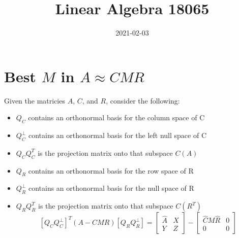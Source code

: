 \documentclass{article}
\title{Linear Algebra 18065}
\date{2021-02-03}
\begin{document}
\maketitle
\section{Best $M$ in $A\approx CMR$}
Given the matricies $A$, $C$, and $R$, consider the following:
\begin{itemize}
  \item $Q_C$ contains an orthonormal basis for the column space of C
  \item $Q_C^\perp$ contains an orthonormal basis for the left null space of C
  \item $Q_C Q_C^T$ is the projection matrix onto that subspace $C(A)$
  \item $Q_R$ contains an orthonormal basis for the row space of R
  \item $Q_R^\perp$ contains an orthonormal basis for the null space of R
  \item $Q_R Q_R^T$ is the projection matrix onto that subspace $C(R^T)$
        \begin{equation}
          \left[Q_C Q_C^\perp\right]^T(A-CMR)\left[Q_R Q_R^\perp\right]=
          \begin{bmatrix}
            \hat{A} & X \\
            Y       & Z
          \end{bmatrix}
          -
          \begin{bmatrix}
            \hat{C}M\hat{R} & 0 \\
            0               & 0
          \end{bmatrix}
        \end{equation}
\end{itemize}
\end{document}
